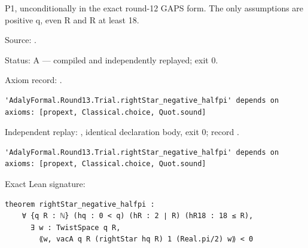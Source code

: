 \begin{theorem}[bp-430]
\label{bp-430}
\leanok
P1, unconditionally in the exact round-12 GAPS form. The only assumptions are positive q, even R and R at least 18.

\par Source: \texttt{}.
\par Status: A — compiled and independently replayed; exit 0.
\par Axiom record: \texttt{}.
\begin{verbatim}
'AdalyFormal.Round13.Trial.rightStar_negative_halfpi' depends on axioms: [propext, Classical.choice, Quot.sound]
\end{verbatim}
\par Independent replay: \texttt{}, identical declaration body, exit 0; record \texttt{}.
\begin{verbatim}
'AdalyFormal.Round13.Trial.rightStar_negative_halfpi' depends on axioms: [propext, Classical.choice, Quot.sound]
\end{verbatim}
\par Exact Lean signature:
\begin{verbatim}
theorem rightStar_negative_halfpi :
    ∀ {q R : ℕ} (hq : 0 < q) (hR : 2 ∣ R) (hR18 : 18 ≤ R),
      ∃ w : TwistSpace q R,
        ⟪w, vacA q R (rightStar hq R) 1 (Real.pi/2) w⟫ < 0
\end{verbatim}
\end{theorem}

